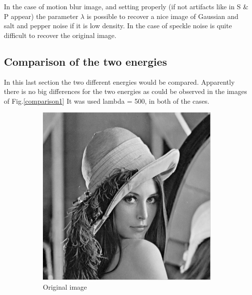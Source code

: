 \documentclass[a4paper, 10pt, conference] {article}
\begin{document}
In the case of motion blur image, and setting properly (if not artifacts like in S \& P appear) the parameter $\lambda$ is possible to recover a nice image of Gaussian and salt and pepper noise if it is low density. In the case of speckle noise is quite difficult to recover the original image.

\subsection{Comparison of the two energies}
In this last section the two different energies would be compared. Apparently there is no big differences for the two energies as could be observed in the images of Fig.\ref{comparison1} 
It was used lambda = 500, in both of the cases.
\begin{figure}[H]
	\centering
	\begin{subfigure}{0.49\textwidth} 
		\centering						
		\includegraphics[scale=0.45]{comparison/original.PNG}
		\caption{Original image}
	\end{subfigure}
	\begin{subfigure}{0.49\textwidth} 
		\centering						

\end{subfigure}
\end{figure}
\end{document}
